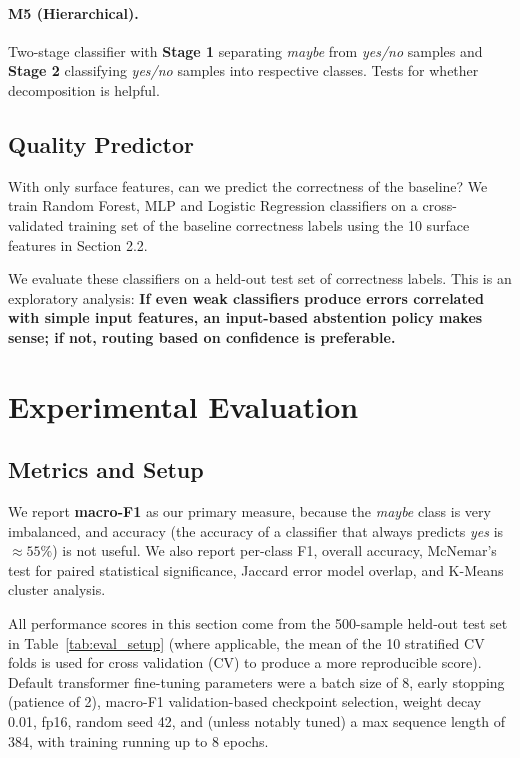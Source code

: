 \documentclass[11pt]{article}
\begin{document}
\paragraph{M5 (Hierarchical).} Two-stage classifier with \textbf{Stage 1} separating \textit{maybe} from \textit{yes/no} samples and \textbf{Stage 2} classifying \textit{yes/no} samples into respective classes. Tests for whether decomposition is helpful.

\subsection{Quality Predictor}

With only surface features, can we predict the correctness of the baseline? We train Random Forest, MLP and Logistic Regression classifiers on a cross-validated training set of the baseline correctness labels using the 10 surface features in Section 2.2.

We evaluate these classifiers on a held-out test set of correctness labels. This is an exploratory analysis: \textbf{If even weak classifiers produce errors correlated with simple input features, an input-based abstention policy makes sense; if not, routing based on confidence is preferable.}

\section{Experimental Evaluation}

\subsection{Metrics and Setup}

We report \textbf{macro-F1} as our primary measure, because the \textit{maybe} class is very imbalanced, and accuracy (the accuracy of a classifier that always predicts \textit{yes} is $\approx 55\%$) is not useful. We also report per-class F1, overall accuracy, McNemar's test for paired statistical significance, Jaccard error model overlap, and K-Means cluster analysis.

All performance scores in this section come from the 500-sample held-out test set in Table~\ref{tab:eval_setup} (where applicable, the mean of the 10 stratified CV folds is used for cross validation (CV) to produce a more reproducible score). Default transformer fine-tuning parameters were a batch size of 8, early stopping (patience of 2), macro-F1 validation-based checkpoint selection, weight decay 0.01, fp16, random seed 42, and (unless notably tuned) a max sequence length of 384, with training running up to 8 epochs.
\end{document}
